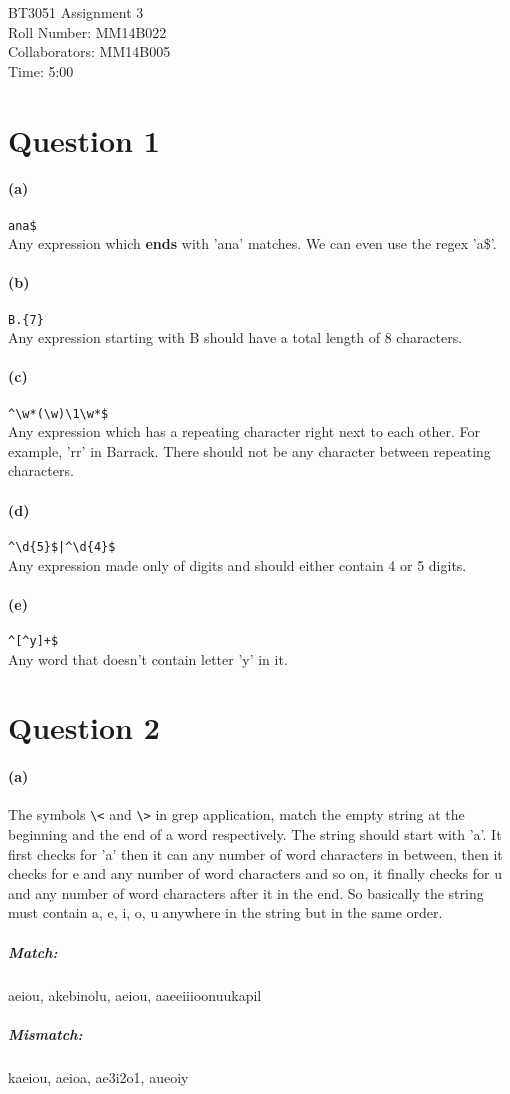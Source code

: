 \documentclass[12]{article}
\begin{document}
\noindent BT3051 Assignment 3 \\
Roll Number: MM14B022 \\
Collaborators: MM14B005 \\
Time: 5:00 

\section*{Question 1}
\paragraph*{(a)}
\verb|ana$| \\
Any expression which \textbf{ends} with 'ana' matches. We can even use the regex 'a\$'.
\paragraph*{(b)}
\verb|B.{7}| \\
Any expression starting with B should have a total length of 8 characters.
\paragraph*{(c)}
\verb|^\w*(\w)\1\w*$| \\
Any expression which has a repeating character right next to each other. For example, 'rr' in Barrack.
There should not be any character between repeating characters.
\paragraph{(d)}
\verb=^\d{5}$|^\d{4}$= \\
Any expression made only of digits and should either contain 4 or 5 digits.
\paragraph*{(e)}
\verb|^[^y]+$| \\
Any word that doesn't contain letter 'y' in it.


\section*{Question 2}

\paragraph*{(a)}
The symbols \verb|\<| and \verb|\>| in grep application, match the empty string at the beginning and the end of a word respectively. The string should start with 'a'. It first checks for 'a' then it can any number of word characters in between, then it checks for e and any number of word characters and so on, it finally checks for u and any number of word characters after it in the end. So basically the string must contain a, e, i, o, u anywhere in the string but in the same order.
\subparagraph*{Match:}
aeiou, akebinolu, aeiou, aaeeiiioonuukapil
\subparagraph*{Mismatch:}
kaeiou, aeioa, ae3i2o1, aueoiy
\end{document}
